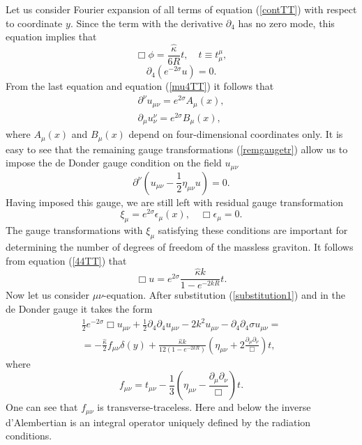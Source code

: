 \documentclass[a4paper,12pt]{article}
\begin{document}
Let us consider Fourier expansion of all terms of  equation
(\ref{contTT}) with respect to coordinate $y$. Since the term
with the derivative $\partial_4$ has no zero mode, this equation implies that
\begin{equation}\label{eqphi}
\Box \phi=\frac{\hat\kappa}{6R}t, \quad t \equiv t_\mu^\mu ,
\end{equation}
\begin{equation}\label{equ}
\partial_4(e^{-2\sigma}u)=0.
\end{equation}
From the last equation and equation (\ref{mu4TT}) it follows that
\begin{eqnarray}
\partial^{\nu}u_{\mu\nu}=e^{2\sigma}A_{\mu}(x), \\
\partial_{\mu}u^{\nu}_{\nu}=e^{2\sigma}B_{\mu}(x),
\end{eqnarray}
where $A_{\mu}(x)$ and $B_{\mu}(x)$ depend on four-dimensional coordinates
only. It is easy to see that the remaining  gauge transformations
(\ref{remgaugetr}) allow us to impose the de Donder gauge condition on the
field $u_{\mu\nu}$
\begin{equation}\label{dedonder}
\partial^\nu\left(u_{\mu\nu}-\frac{1}{2}\eta_{\mu\nu}
u\right)=0.
\end{equation}
Having imposed this gauge, we are still left with residual gauge
transformation
\begin{equation}\label{ostatgauge}
\xi_\mu = e^{2\sigma}\epsilon_\mu(x), \quad \Box\epsilon_{\mu}=0.
\end{equation}
The gauge transformations with $\xi_\mu$ satisfying these
conditions are important for determining the number of degrees of
freedom of the massless graviton. It follows from equation
(\ref{44TT}) that
\begin{equation}\label{boxu}
\Box u=e^{2\sigma}\frac{\hat\kappa k}{1-e^{-2kR}}t.
\end{equation}
Now let us consider $\mu\nu$-equation. After substitution
(\ref{substitution1}) and in the de Donder gauge it takes the form
\begin{eqnarray}\label{munuDeD}
\frac{1}{2}e^{-2\sigma}\Box u_{\mu\nu}+\frac{1}{2}\partial_4
\partial_4 u_{\mu\nu}-2k^2u_{\mu\nu}-\partial_4
\partial_4\sigma u_{\mu\nu}= \\ \nonumber
=-\frac{\hat\kappa}{2}f_{\mu\nu}\delta(y)+\frac{\hat\kappa
k}{12(1-e^{-2kR})}\left(\eta_{\mu\nu}+2\frac{\partial_\mu\partial_\nu}{\Box}
\right)t,
\end{eqnarray}
where
\begin{equation}
f_{\mu\nu}=t_{\mu\nu}-\frac{1}{3}\left(\eta_{\mu\nu}-
\frac{\partial_\mu\partial_\nu}{\Box}\right)t.
\end{equation}
One can see that $f_{\mu\nu}$ is transverse-traceless. Here and below
the  inverse d'Alembertian is an integral operator uniquely  defined by
the  radiation conditions.
\end{document}
